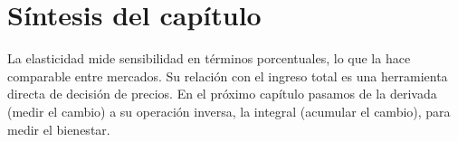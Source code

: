 \section{Síntesis del capítulo}

La elasticidad mide sensibilidad en términos porcentuales, lo que la hace comparable entre mercados. Su relación con el ingreso total es una herramienta directa de decisión de precios. En el próximo capítulo pasamos de la derivada (medir el cambio) a su operación inversa, la integral (acumular el cambio), para medir el bienestar.
